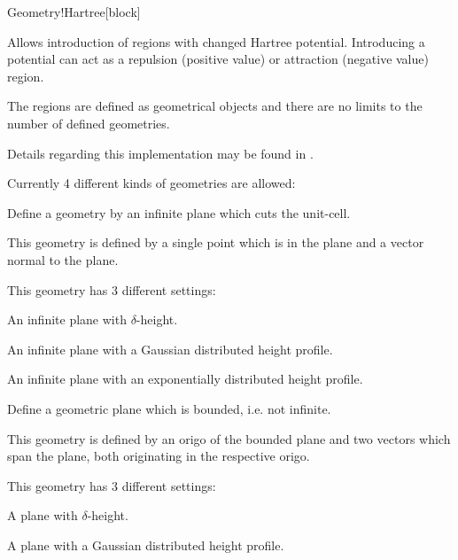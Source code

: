   
  \begin{fdfentry}{Geometry!Hartree}[block]%
  
    Allows introduction of regions with changed Hartree
    potential. Introducing a potential can act as a repulsion
    (positive value) or attraction (negative value) region.
  
    The regions are defined as geometrical objects and there are no
    limits to the number of defined geometries.
  
    Details regarding this implementation may be found in
    \citet{Papior2016a}.
  
    Currently 4 different kinds of geometries are allowed:
    \begin{fdfoptions}
  
  
  
      Define a geometry by an infinite plane which cuts the unit-cell.
  
      This geometry is defined by a single point which is in the plane
      and a vector normal to the plane.
  
      This geometry has 3 different settings:
      \begin{fdfoptions}
        \option[delta] %
        An infinite plane with $\delta$-height.
  
        \option[gauss] %
        An infinite plane with a Gaussian distributed height profile.
  
        \option[exp] %
        An infinite plane with an exponentially distributed height
        profile.
  
      \end{fdfoptions}
  
  
  
      Define a geometric plane which is bounded, i.e. not infinite.
  
      This geometry is defined by an origo of the bounded plane and two
      vectors which span the plane, both originating in the respective
      origo.
  
      This geometry has 3 different settings:
      \begin{fdfoptions}
  
        \option[delta] %
        A plane with $\delta$-height.
  
        \option[gauss] %
        A plane with a Gaussian distributed height profile.
  

\end{fdfoptions}
\end{fdfoptions}
\end{fdfentry}

